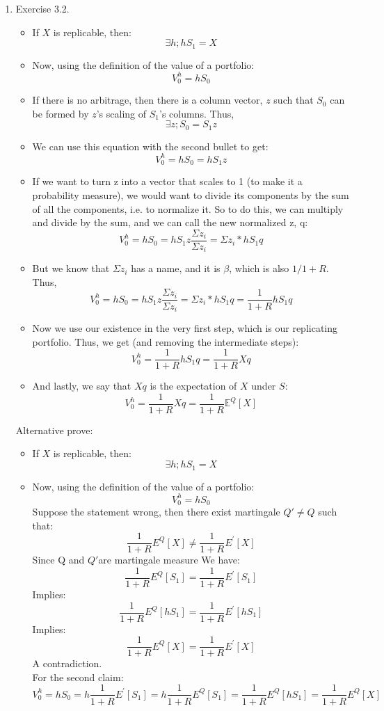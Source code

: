 \documentclass[12pt]{article}
\newcommand{\Ex}{\mathbf{E}}
\begin{document}
\begin{enumerate}
\begin{itemize}
\begin{comment} 
  \textit{Solution}: The arbitrage free date 0 price of $Put4$ is $\frac{1}{2} \Ex^{(\frac{1}{4}, \frac{1}{4}, \frac{1}{2})} Put4_1 = \frac{1}{2} (\frac{1}{2} \cdot 2) = \frac{1}{2}$.
\end{comment}
\end{itemize}
  \item Exercise 3.2.
  \begin{itemize}
      \item If $X$ is replicable, then:
      $$\exists h; hS_1 = X$$
      \item Now, using the definition of the value of a portfolio:
      $$V_0^h = hS_0$$
      \item If there is no arbitrage, then there is a column vector, $z$ such that $S_0$ can be formed by $z$'s scaling of $S_1$'s columns. Thus,
      $$\exists z; S_0 = S_1z$$
      \item We can use this equation with the second bullet to get:
      $$V_0^h = hS_0 = hS_1z$$
      \item If we want to turn z into a vector that scales to 1 (to make it a probability measure), we would want to divide its components by the sum of all the components, i.e. to normalize it. So to do this, we can multiply and divide by the sum, and we can call the new normalized z, q:
      $$V_0^h = hS_0 = hS_1z \frac{\Sigma z_i}{\Sigma z_i} = \Sigma z_i * hS_1q $$
      \item But we know that $\Sigma z_i$ has a name, and it is $\beta$, which is also $1/1+R$. Thus,
      $$V_0^h = hS_0 = hS_1z \frac{\Sigma z_i}{\Sigma z_i} = \Sigma z_i * hS_1q =  \frac{1}{1+R}hS_1q$$
      \item Now we use our existence in the very first step, which is our replicating portfolio.  Thus, we get (and removing the intermediate steps):
      $$V_0^h =  \frac{1}{1+R}hS_1q = \frac{1}{1+R}Xq $$
      \item And lastly, we say that $Xq$ is the expectation of $X$ under $S$:
      $$V_0^h = \frac{1}{1+R}Xq = \frac{1}{1+R}\mathbb{E}^Q[X]$$
  \end{itemize}
  Alternative prove:\\
   \begin{itemize}
  
      \item If $X$ is replicable, then:
      $$\exists h; hS_1 = X$$
      \item Now, using the definition of the value of a portfolio:
      $$V_0^h = hS_0$$
      Suppose the statement wrong, then there exist martingale $Q' \neq Q$ such that:
      $$\frac{1}{1+R}E^Q[X] \neq \frac{1}{1+R}E^{\prime}[X] $$
     Since Q and $Q' $are martingale measure We have:
      $$\frac{1}{1+R}E^Q[S_1] =\frac{1}{1+R}E^{\prime}[S_1] $$
      Implies:
      $$\frac{1}{1+R}E^Q[hS_1] =\frac{1}{1+R}E^{\prime}[hS_1]$$
      Implies:
      $$\frac{1}{1+R}E^Q[X] = \frac{1}{1+R}E^{\prime}[X] $$
      A contradiction.\\
      For the second claim:
     $$ V_0^h = hS_0 = h \frac{1}{1+R}E^{\prime}[S_1] = h \frac{1}{1+R}E^Q[S_1] = \frac{1}{1+R}E^Q[hS_1] = \frac{1}{1+R}E^Q[X]$$
    

\end{itemize}
\end{enumerate}
\end{document}
